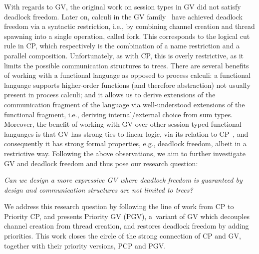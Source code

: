 \documentclass[main.tex]{subfiles}
\begin{document}
With regards to GV, the original work on session types in GV \cite{gayvasconcelos10,gayvasconcelos12} did not satisfy deadlock freedom. Later on, calculi in the GV family~\cite{wadler15,lindleymorris15} have achieved deadlock freedom via a syntactic restriction, i.e., by combining channel creation and thread spawning into a single operation, called fork. This corresponds to the logical cut rule in CP, which respectively is the combination of a name restriction and a parallel composition.
Unfortunately, as with CP, this is overly restrictive, as it limits the possible communication structures to trees.
There are several benefits of working with a functional language as opposed to process calculi: a functional language supports higher-order functions (and therefore abstraction) not usually present in process calculi; and it allows us to derive extensions of the communication fragment of the language via well-understood extensions of the functional fragment, i.e., deriving internal/external choice from sum types. Moreover, the benefit of working with GV over other session-typed functional languages is that GV has strong ties to linear logic, via its relation to CP~\cite{wadler12}, and consequently it has strong formal properties, e.g., deadlock freedom, albeit in a restrictive way.
Following the above observations, we aim to further investigate GV and deadlock freedom and thus pose our research question:

\emph{Can we design a more expressive GV where deadlock freedom is guaranteed by design and communication structures are not limited to trees?}

We address this research question by following the line of work from CP to Priority CP, and presents 
Priority GV (PGV), a~variant of GV which decouples channel creation from thread creation, and restores deadlock freedom by adding priorities. This work closes the circle of the strong connection of CP and GV, together with their priority versions, PCP and PGV.
\end{document}

